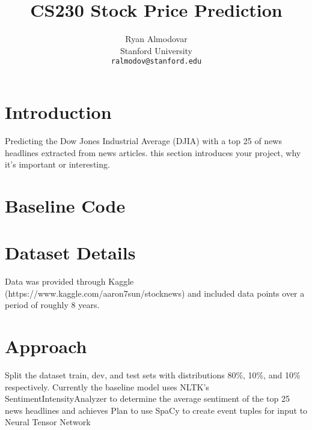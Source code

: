 \documentclass{article} %
\title{CS230 Stock Price Prediction}
\author{
Ryan Almodovar \\
Stanford University\\
\texttt{ralmodov@stanford.edu} \\
}
\begin{document}
\maketitle


\section{Introduction}
Predicting the Dow Jones Industrial Average (DJIA) with a top 25 of news headlines extracted from news articles.
this section introduces your project, why it’s important or interesting.

\section{Baseline Code}

\section{Dataset Details}
Data was provided through Kaggle (https://www.kaggle.com/aaron7sun/stocknews) and included data points over a period of roughly 8 years.

\section{Approach}
Split the dataset train, dev, and test sets with distributions 80\%, 10\%, and 10\% respectively.
Currently the baseline model uses NLTK's SentimentIntensityAnalyzer to determine the average sentiment of the top 25 news headlines and achieves
Plan to use SpaCy to create event tuples for input to Neural Tensor Network
\end{document}
